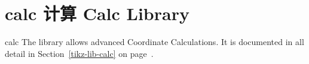 
\section{calc 计算 Calc Library}

\begin{tikzlibrary}{calc}
    The library allows advanced Coordinate Calculations. It is documented in
    all detail in Section~\ref{tikz-lib-calc} on page~\pageref{tikz-lib-calc}.
\end{tikzlibrary}
